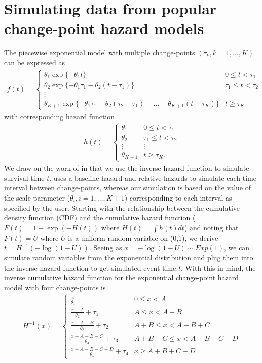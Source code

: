 \section{Simulating data from popular change-point hazard models}

The piecewise exponential model with multiple change-points $(\tau_k, k=1,\ldots,K)$ can be expressed as 
%
\begin{align}
f(t)=\begin{cases}
\theta_1\exp\{-\theta_1t\} & 0\leq t<\tau_1\\
\theta_2\exp\{-\theta_1\tau_1-\theta_2(t-\tau_1)\} & \tau_1\leq t <\tau_2\\
\vdots\\
\theta_{K+1}\exp\{-\theta_1\tau_1-\theta_2(\tau_2-\tau_1)-\ldots-\theta_{K+1}(t-\tau_K) \} & t\geq\tau_K
\end{cases}\label{exponential pdf}
\end{align} 
%
with corresponding hazard function 
%
\begin{align}
	h(t)=\begin{cases}
	\theta_1 & 0\leq t<\tau_1\\
	\theta_2 & \tau_1\leq t <\tau_2\\
	\vdots & \vdots \\
	\theta_{K+1} & t\geq\tau_K.
	\end{cases}
	\label{exponential hazard}
\end{align} 
%
We draw on the work of \cite{Walke} in that we use the inverse hazard function to simulate survival time $t$. \cite{Walke} uses a baseline hazard and relative hazards to simulate each time interval between change-points, whereas our simulation is based on the value of the scale parameter ($\theta_i, i = 1,\ldots, K+1$) corresponding to each interval as specified by the user. Starting with the relationship between the cumulative density function (CDF) and the cumulative hazard function ($F(t)=1-\exp(-H(t))$ where $H(t)=\int h(t)dt$) and noting that $F(t)=U$ where $U$ is a uniform random variable on (0,1), we derive $t=H^{-1}(-\log(1-U))$. Seeing as $x=-\log(1-U)\sim Exp(1)$, we can simulate random variables from the exponential distribution and plug them into the inverse hazard function to get simulated event time $t$. With this in mind, the inverse cumulative hazard function for the exponential change-point hazard model with four change-points is
%
\begin{align}
H^{-1}(x)=\begin{cases}
\frac{x}{\theta_1} & 0\leq x<A\\
\frac{x-A}{\theta_2}+\tau_1 & A\leq x<A+B\\
\frac{x-A-B}{\theta_3}+\tau_2 & A+B\leq x <A+B+C\\
\frac{x-A-B-C}{\theta_4}+\tau_3 & A+B+C\leq x<A+B+C+D\\
\frac{x-A-B-C-D}{\theta_5}+\tau_4 & x\geq A+B+C+D
\end{cases}
\end{align}

